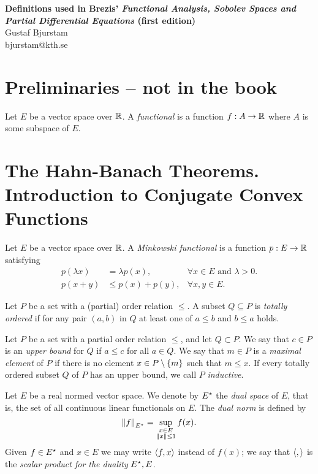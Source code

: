 \documentclass[11pt]{article}
\begin{document}
\begin{center}
\textbf{\large Definitions used in Brezis' \textit{Functional Analysis, Sobolev Spaces and Partial Differential Equations} (first edition)} \\
Gustaf Bjurstam\\
bjurstam@kth.se\\
\end{center}
\section*{Preliminaries -- not in the book}
\begin{definition}
    Let $E$ be a vector space over $\mathbb{R}$. A \textit{functional} is a function $f:A\to\mathbb{R}$ where $A$ is some subspace of $E$.
\end{definition}

\section{The Hahn-Banach Theorems. Introduction to Conjugate Convex Functions}
\begin{definition}
    Let $E$ be a vector space over $\mathbb{R}$. A \textit{Minkowski functional} is a function $p:E\to\mathbb{R}$ satisfying
    \begin{align}
        p(\lambda x) &= \lambda p(x), &\forall x\in E \text{ and } \lambda > 0.\\
        p(x+y) &\leq p(x)+p(y), &\forall x,y\in E.
    \end{align}
\end{definition}

\begin{definition}
    Let $P$ be a set with a (partial) order relation $\leq$. A subset $Q\subseteq P$ is \textit{totally ordered} if for any pair $(a,b)$ in $Q$ at least one of $a\leq b$ and $b\leq a$ holds. 
\end{definition}

\begin{definition}
    Let $P$ be a set with a partial order relation $\leq$, and let $Q\subset P$. We say that $c\in P$ is an \textit{upper bound} for $Q$ if $a\leq c$ for all $a\in Q$. We say that $m\in P$ is a \textit{maximal element} of $P$ if there is no element $x\in P\setminus\left\{m\right\}$ such that $m\leq x$. If every totally ordered subset $Q$ of $P$ has an upper bound, we call $P$ \textit{inductive}.
\end{definition}

\begin{definition}
    Let $E$ be a real normed vector space. We denote by $E{}^{\star}$ the \textit{dual space} of $E$, that is, the set of all continuous linear functionals on $E$. The \textit{dual norm} is defined by
    \begin{equation*}
        \left\lVert f\right\rVert_{E{}^{\star}} = \sup_{\substack{x\in E\\ \left\lVert x\right\rVert \leq 1}} f(x).
    \end{equation*}
    Given $f\in E{}^{\star}$ and $x\in E$ we may write $\left\langle f, x\right\rangle$ instead of $f(x)$; we say that $\left\langle, \right\rangle$ is the \textit{scalar product for the duality} $E{}^{\star}, E$. 
\end{definition}
\end{document}
